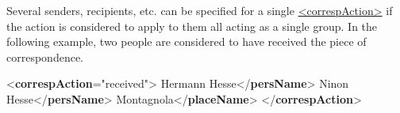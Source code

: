 Several senders, recipients, etc. can be specified for a single \hyperref[TEI.correspAction]{<correspAction>} if the action is considered to apply to them all acting as a single group. In the following example, two people are considered to have received the piece of correspondence. \par\bgroup{}\exampleFont \begin{shaded}\noindent\mbox{}{<\textbf{correspAction}\hspace*{1em}{type}="{received}">}\mbox{}\newline 
{}Hermann Hesse{</\textbf{persName}>}\mbox{}\newline 
{}Ninon Hesse{</\textbf{persName}>}\mbox{}\newline 
{}Montagnola{</\textbf{placeName}>}\mbox{}\newline 
{</\textbf{correspAction}>}\end{shaded}\egroup\par \par
